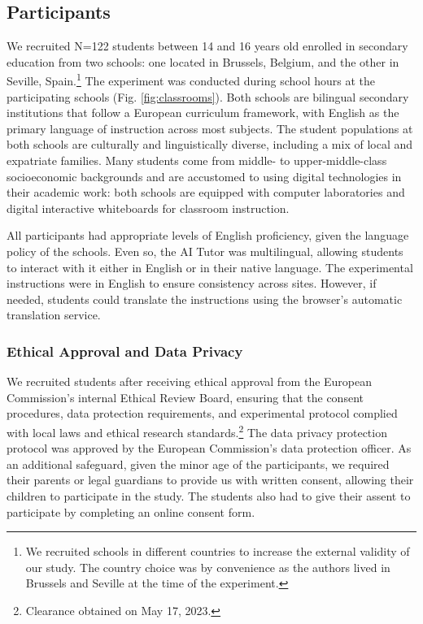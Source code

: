 \documentclass[
  12pt,
]{article}
\begin{document}
\subsection{Participants}\label{participants}

We recruited N=122 students between 14 and 16 years old enrolled in secondary education from two schools: one located in Brussels, Belgium, and the other in Seville, Spain.\footnote{We recruited schools in different countries to increase the external validity of our study. The country choice was by convenience as the authors lived in Brussels and Seville at the time of the experiment.} The experiment was conducted during school hours at the participating schools (Fig. \ref{fig:classrooms}). Both schools are bilingual secondary institutions that follow a European curriculum framework, with English as the primary language of instruction across most subjects. The student populations at both schools are culturally and linguistically diverse, including a mix of local and expatriate families. Many students come from middle- to upper-middle-class socioeconomic backgrounds and are accustomed to using digital technologies in their academic work: both schools are equipped with computer laboratories and digital interactive whiteboards for classroom instruction.

All participants had appropriate levels of English proficiency, given the language policy of the schools. Even so, the AI Tutor was multilingual, allowing students to interact with it either in English or in their native language. The experimental instructions were in English to ensure consistency across sites. However, if needed, students could translate the instructions using the browser's automatic translation service.

\subsubsection{Ethical Approval and Data Privacy}\label{ethical-approval-and-data-privacy}

We recruited students after receiving ethical approval from the European Commission's internal Ethical Review Board, ensuring that the consent procedures, data protection requirements, and experimental protocol complied with local laws and ethical research standards.\footnote{Clearance obtained on May 17, 2023.} The data privacy protection protocol was approved by the European Commission's data protection officer. As an additional safeguard, given the minor age of the participants, we required their parents or legal guardians to provide us with written consent, allowing their children to participate in the study. The students also had to give their assent to participate by completing an online consent form.
\end{document}
